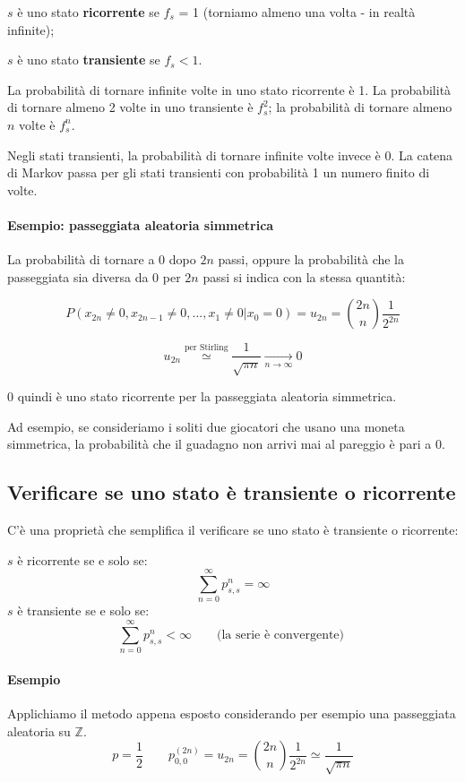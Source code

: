 \documentclass[a4paper,12pt]{book}
\begin{document}
$ s $ è uno stato \textbf{ricorrente} se $ f_s $ = 1 (torniamo almeno una volta - in realtà infinite);

$ s $ è uno stato \textbf{transiente} se $ f_s < 1 $.

La probabilità di tornare infinite volte in uno stato ricorrente è 1. La probabilità di tornare almeno 2 volte in uno transiente è $ f_s^2 $; la probabilità di tornare almeno $ n $ volte è $ f_s^n $.

Negli stati transienti, la probabilità di tornare infinite volte invece è 0. La catena di Markov passa per gli stati transienti con probabilità 1 un numero finito di volte. 

\paragraph{Esempio: passeggiata aleatoria simmetrica}

La probabilità di tornare a 0 dopo $ 2n $ passi, oppure la probabilità che la passeggiata sia diversa da 0 per $ 2n $ passi si indica con la stessa quantità:

$$ P(x_{2n} \ne 0, x_{2n-1} \ne 0, ..., x_{1} \ne 0 | x_0 = 0) = u_{2n} = \binom{2n}{n}\frac{1}{2^{2n}}$$

$$u_{2n} \overset{ \text{per Stirling} }{\simeq} \frac{1}{\sqrt{\pi n}} \underset{n \to \infty}{\longrightarrow} 0$$

0 quindi è uno stato ricorrente per la passeggiata aleatoria simmetrica. 

Ad esempio, se consideriamo i soliti due giocatori che usano una moneta simmetrica, la probabilità che il guadagno non arrivi mai al pareggio è pari a 0. 

\subsection{Verificare se uno stato è transiente o ricorrente}
C'è una proprietà che semplifica il verificare se uno stato è transiente o ricorrente:

$ s $ è ricorrente se e solo se:
$$ \sum_{n=0}^{\infty} p_{s,s}^{n} = \infty $$
$ s $ è transiente se e solo se:
$$ \sum_{n=0}^{\infty} p_{s,s}^{n} < \infty \qquad \text{(la serie è convergente) } $$

\paragraph{Esempio} Applichiamo il metodo appena esposto considerando per esempio una passeggiata aleatoria su $ \mathbb{Z} $.
$$ p = \frac{1}{2} \qquad p_{0,0}^{(2n)} = u_{2n} = \binom{2n}{n}\frac{1}{2^{2n}} \simeq \frac{1}{\sqrt{\pi n}} $$
\end{document}
